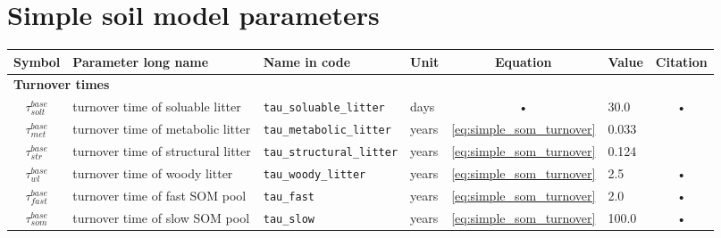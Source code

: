 \begin{table}
\section{Simple soil model parameters}\label{tab:sb:param}


\begin{tabularx}{\linewidth}{|c|X|l|l|c|l|c|} %
\hline 
Symbol & Parameter long name & Name in code & Unit & Equation & Value & Citation \\ 
\hline 

\multicolumn{6}{l}{\bf Turnover times}\\
\hline
$\tau^{base}_{solt}$ & turnover time of soluable litter & \texttt{tau\_soluable\_litter} & days & • & 30.0 & • \\ 
$\tau^{base}_{met}$ & turnover time of metabolic litter & \texttt{tau\_metabolic\_litter} & years & \ref{eq:simple_som_turnover}  & 0.033 & \cite{Parton:1993ud}  \\ 
$\tau^{base}_{str}$ & turnover time of structural litter & \texttt{tau\_structural\_litter} & years & \ref{eq:simple_som_turnover}  & 0.124 & \cite{Parton:1993ud} \\ 
$\tau^{base}_{wl}$ & turnover time of woody litter & \texttt{tau\_woody\_litter} & years & \ref{eq:simple_som_turnover} &  2.5 & • \\ 
$\tau^{base}_{fast}$ & turnover time of fast SOM pool & \texttt{tau\_fast} & years & \ref{eq:simple_som_turnover} & 2.0 & • \\ 
$\tau^{base}_{som}$ & turnover time of slow SOM pool & \texttt{tau\_slow} & years & \ref{eq:simple_som_turnover} & 100.0 & • \\ 
\hline 


\end{tabularx}
\end{table}
